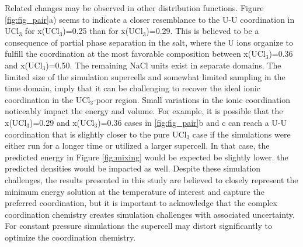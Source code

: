 \documentclass[preprint,3p,10pt,onecolumn,number,sort&compress]{elsarticle}
\begin{document}
{Related changes may be observed in other distribution functions. Figure \ref{fig:fig_pair}a) seems to indicate a closer resemblance to the U-U coordination in UCl$_3$ for x(UCl$_3$)=0.25 than for x(UCl$_3$)=0.29. This is believed to be a consequence of partial phase separation in the salt, where the U ions organize to fulfill the coordination at the most favorable composition between x(UCl$_3$)=0.36 and x(UCl$_3$)=0.50. The remaining NaCl units exist in separate domains. The limited size of the simulation supercells and somewhat limited sampling in the time domain, imply that it can be challenging to recover the ideal ionic coordination in the UCl$_3$-poor region. Small variations in the ionic coordination noticeably impact the energy and volume. For example, it is possible that the x(UCl$_3$)=0.29 and x(UCl$_3$)=0.36 cases in \ref{fig:fig_pair}b and c can reach a U-U coordination that is slightly closer to the pure UCl$_3$ case if the simulations were either run for a longer time or utilized a larger supercell. In that case, the predicted energy in Figure \ref{fig:mixing} would be expected be slightly lower. the predicted densities would be impacted as well. Despite these simulation challenges, the results presented in this study are believed to closely represent the minimum energy solution at the temperature of interest and capture the preferred coordination, but it is important to acknowledge that the complex coordination chemistry creates simulation challenges with associated uncertainty. For constant pressure simulations the supercell may distort significantly to optimize the coordination chemistry.

}
\end{document}
